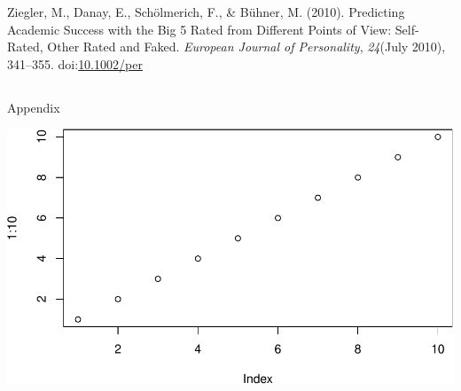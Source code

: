 \documentclass[,man,floatsintext]{apa6}
\theoremstyle{definition}
\theoremstyle{definition}
\theoremstyle{definition}
\theoremstyle{remark}
\begin{document}
\leavevmode\hypertarget{ref-Ziegler2010}{}%
Ziegler, M., Danay, E., Schölmerich, F., \& Bühner, M. (2010).
Predicting Academic Success with the Big 5 Rated from Different Points
of View: Self-Rated, Other Rated and Faked. \emph{European Journal of
Personality}, \emph{24}(July 2010), 341--355.
doi:\href{https://doi.org/10.1002/per}{10.1002/per}

\endgroup

\clearpage
\makeatletter
\efloat@restorefloats
\makeatother


\begin{appendix}
\section{}
Appendix

\includegraphics{IPIP_draft_files/figure-latex/unnamed-chunk-4-1.pdf}
\end{appendix}
\end{document}

